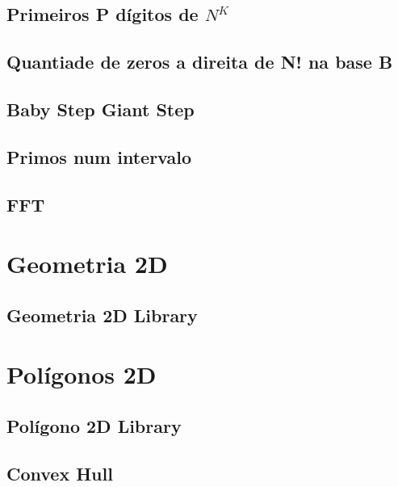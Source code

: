 \subsection{Primeiros P dígitos de $N^K$}
\raggedbottom
\hrulefill
\subsection{Quantiade de zeros a direita de N! na base B}
\raggedbottom
\hrulefill
\subsection{Baby Step Giant Step}
\raggedbottom
\hrulefill
\subsection{Primos num intervalo}
\raggedbottom
\hrulefill
\subsection{FFT}
\raggedbottom
\hrulefill

\section{Geometria 2D}
\subsection{Geometria 2D Library}
\raggedbottom
\hrulefill

\section{Polígonos 2D}
\subsection{Polígono 2D Library}
\raggedbottom
\hrulefill
\subsection{Convex Hull}
\raggedbottom
\hrulefill
